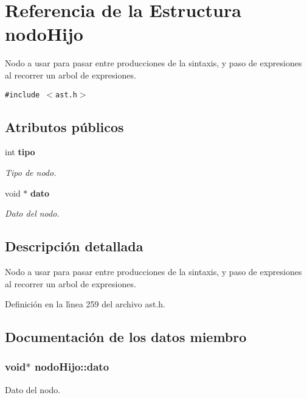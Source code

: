 \section{Referencia de la Estructura nodo\-Hijo}
\label{structnodoHijo}
Nodo a usar para pasar entre producciones de la sintaxis, y paso de expresiones al recorrer un arbol de expresiones.  


{\tt \#include $<$ast.h$>$}

\subsection*{Atributos p\'{u}blicos}
\begin{CompactItemize}
\item 
int {\bf tipo}
\begin{CompactList}\small\item\em Tipo de nodo. \item\end{CompactList}\item 
void $\ast$ {\bf dato}
\begin{CompactList}\small\item\em Dato del nodo. \item\end{CompactList}\end{CompactItemize}


\subsection{Descripci\'{o}n detallada}
Nodo a usar para pasar entre producciones de la sintaxis, y paso de expresiones al recorrer un arbol de expresiones. 



Definici\'{o}n en la l\'{\i}nea 259 del archivo ast.h.

\subsection{Documentaci\'{o}n de los datos miembro}
\subsubsection{\setlength{\rightskip}{0pt plus 5cm}void$\ast$ {\bf nodo\-Hijo::dato}}\label{structnodoHijo_o1}


Dato del nodo. 



